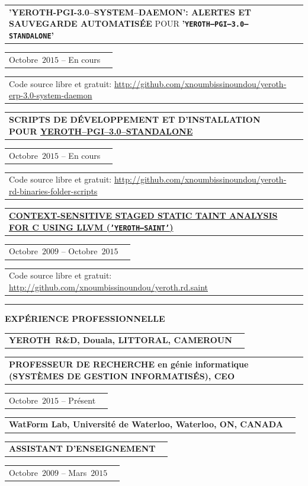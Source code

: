 \documentclass[9pt,a4paper]{article} %
\makeatletter
\newcommand{\yerothrd}{YEROTH~R\&D\xspace}
\newcommand{\headerrow}[2]
{\begin{tabular*}{\linewidth}{l@{\extracolsep{\fill}}r}
	#1 &
	#2 \\
\end{tabular*}}
\newcommand{\headerrowONE}[1]{\headerrow{#1}{}}
\newcommand{\cvitemdate}[2]{#1~$#2$\xspace}
\newcommand{\cvitempositionheld}[1]{\textbf{#1}\xspace}
\makeatother
\begin{document}
\vspace{0.3em}

\headerrowONE{\textbf{'YEROTH-PGI-3.0--SYSTEM--DAEMON': ALERTES ET SAUVEGARDE AUTOMATISÉE}
  POUR \textbf{'\texttt{YEROTH--PGI--3.0--STANDALONE}'}}
  \headerrowONE{\cvitemdate{Octobre}{2015} -- En cours}
\headerrowONE{Code source libre et gratuit: \url{http://github.com/xnoumbissinoundou/yeroth-erp-3.0-system-daemon}}

\vspace{0.3em}

\headerrowONE{\textbf{SCRIPTS DE DÉVELOPPEMENT ET D'INSTALLATION
  POUR 
  \href{http://github.com/xnoumbissinoundou/yeroth-erp-3.0}{\textbf{YEROTH--PGI--3.0--STANDALONE}}}}
  \headerrowONE{\cvitemdate{Octobre}{2015} -- En cours}
\headerrowONE{Code source libre et gratuit: \url{http://github.com/xnoumbissinoundou/yeroth-rd-binaries-folder-scripts}}

\vspace{0.3em}

\headerrowONE{\href{http://archive.org/download/yeroth-saint/YEROTH-SAINT.PDF}{\textbf{CONTEXT-SENSITIVE STAGED STATIC TAINT ANALYSIS FOR C USING LLVM (\texttt{'YEROTH--SAINT'})}}}
\headerrowONE{\cvitemdate{Octobre}{2009} -- \cvitemdate{Octobre}{2015}}
\headerrowONE{Code source libre et gratuit: \url{http://github.com/xnoumbissinoundou/yeroth.rd.saint}}
	
	
\vspace{1em}


\hrule
\begin{center}
{\large \textbf{EXPÉRIENCE PROFESSIONNELLE}}
\end{center}

\vspace{0.5em}

\headerrowONE{\textbf{\yerothrd, Douala, LITTORAL, CAMEROUN}}
\headerrowONE{\cvitempositionheld{PROFESSEUR DE RECHERCHE en génie informatique 
	(SYSTÈMES DE GESTION INFORMATISÉS), CEO}}
\headerrowONE{\cvitemdate{Octobre}{2015} -- Présent}	

\vspace{0.3em}

\headerrowONE{\textbf{WatForm Lab, Université de Waterloo, Waterloo, ON, CANADA}}	
\headerrowONE{\cvitempositionheld{ASSISTANT D'ENSEIGNEMENT}}
\headerrowONE{\cvitemdate{Octobre}{2009} -- \cvitemdate{Mars}{2015}}
	
\vspace{0.3em}
\end{document}
